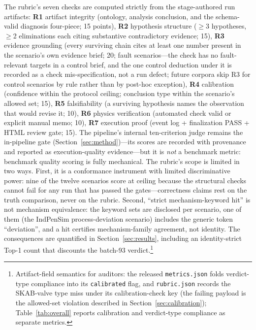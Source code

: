 \documentclass[preprint,12pt]{elsarticle}
\begin{document}
The rubric's seven checks are computed strictly from the stage-authored run artifacts: \textbf{R1} artifact integrity (ontology, analysis conclusion, and the schema-valid diagnosis four-piece; 15 points), \textbf{R2} hypothesis structure ($\ge$3 hypotheses, $\ge$2 eliminations each citing substantive contradictory evidence; 15), \textbf{R3} evidence grounding (every surviving chain cites at least one number present in the scenario's own evidence brief; 20; fault scenarios---the check has no fault-relevant targets in a control brief, and the one control deduction under it is recorded as a check mis-specification, not a run defect; future corpora skip R3 for control scenarios by rule rather than by post-hoc exception), \textbf{R4} calibration (confidence within the protocol ceiling; conclusion type within the scenario's allowed set; 15), \textbf{R5} falsifiability (a surviving hypothesis names the observation that would revise it; 10), \textbf{R6} physics verification (automated check valid or explicit manual memo; 10), \textbf{R7} execution proof (event log + finalization PASS + HTML review gate; 15). The pipeline's internal ten-criterion judge remains the in-pipeline gate (Section~\ref{sec:method})---its scores are recorded with provenance and reported as execution-quality evidence---but it is \emph{not} a benchmark metric: benchmark quality scoring is fully mechanical. The rubric's scope is limited in two ways. First, it is a conformance instrument with limited discriminative power: nine of the twelve scenarios score at ceiling because the structural checks cannot fail for any run that has passed the gates---correctness claims rest on the truth comparison, never on the rubric. Second, ``strict mechanism-keyword hit'' is not mechanism equivalence: the keyword sets are disclosed per scenario, one of them (the IndPenSim process-deviation scenario) includes the generic token ``deviation'', and a hit certifies mechanism-family agreement, not identity. The consequences are quantified in Section~\ref{sec:results}, including an identity-strict Top-1 count that discounts the batch-93 verdict.\footnote{Artifact-field semantics for auditors: the released \texttt{metrics.json} folds verdict-type compliance into its \texttt{calibrated} flag, and \texttt{rubric.json} records the SKAB-valve type miss under its calibration-check key (the failing payload is the allowed-set violation described in Section~\ref{sec:calibration}); Table~\ref{tab:overall} reports calibration and verdict-type compliance as separate metrics.}
\end{document}
